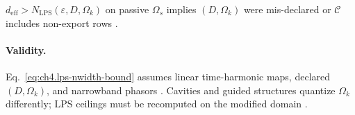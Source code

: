 \begin{corollary}
\label{cor:ch4.lps-domain}
\(d_{\mathrm{eff}}>N_{\mathrm{LPS}}(\varepsilon,D,\Omega_{k})\) on passive \(\Omega_{s}\) implies \((D,\Omega_{k})\) were mis-declared or
\(\mathcal{C}\) includes non-export rows \cite{hansen1988,harrington2001,devaney2004,stratton1941}.
\end{corollary}

\paragraph{Validity.}
Eq.~\eqref{eq:ch4.lps-nwidth-bound} assumes linear time-harmonic maps, declared \((D,\Omega_{k})\), and narrowband phasors \cite{stratton1941,hansen1988}.
Cavities and guided structures quantize \(\Omega_{k}\) differently; LPS ceilings must be recomputed on the modified domain \cite{harrington2001,jackson1999,devaney2004}.

